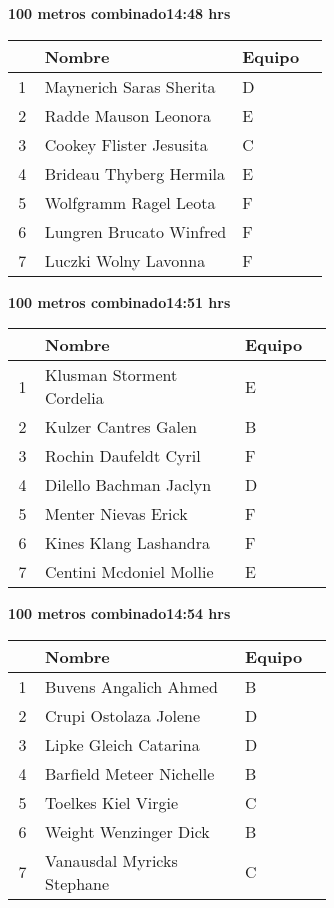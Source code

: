 \begin{minipage}{0.95\linewidth}
\begin{center}
\textbf{
100 metros combinado\hspace{1cm}14:48 hrs}
\end{center}
\begin{tabular}{cp{0.63\linewidth}l}
\hline
& \textbf{Nombre} & \textbf{Equipo} \\ \hline
1 & Maynerich Saras Sherita & D \\ 
2 & Radde Mauson Leonora & E \\ 
3 & Cookey Flister Jesusita & C \\ 
4 & Brideau Thyberg Hermila & E \\ 
5 & Wolfgramm Ragel Leota & F \\ 
6 & Lungren Brucato Winfred & F \\ 
7 & Luczki Wolny Lavonna & F \\ 
\end{tabular}
\end{minipage}
\begin{minipage}{0.95\linewidth}
\begin{center}
\textbf{
100 metros combinado\hspace{1cm}14:51 hrs}
\end{center}
\begin{tabular}{cp{0.63\linewidth}l}
\hline
& \textbf{Nombre} & \textbf{Equipo} \\ \hline
1 & Klusman Storment Cordelia & E \\ 
2 & Kulzer Cantres Galen & B \\ 
3 & Rochin Daufeldt Cyril & F \\ 
4 & Dilello Bachman Jaclyn & D \\ 
5 & Menter Nievas Erick & F \\ 
6 & Kines Klang Lashandra & F \\ 
7 & Centini Mcdoniel Mollie & E \\ 
\end{tabular}
\end{minipage}
\begin{minipage}{0.95\linewidth}
\begin{center}
\textbf{
100 metros combinado\hspace{1cm}14:54 hrs}
\end{center}
\begin{tabular}{cp{0.63\linewidth}l}
\hline
& \textbf{Nombre} & \textbf{Equipo} \\ \hline
1 & Buvens Angalich Ahmed & B \\ 
2 & Crupi Ostolaza Jolene & D \\ 
3 & Lipke Gleich Catarina & D \\ 
4 & Barfield Meteer Nichelle & B \\ 
5 & Toelkes Kiel Virgie & C \\ 
6 & Weight Wenzinger Dick & B \\ 
7 & Vanausdal Myricks Stephane & C \\ 
\end{tabular}
\end{minipage}
